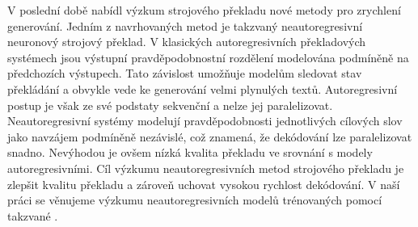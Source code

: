 V poslední době nabídl výzkum strojového překladu nové metody pro zrychlení
generování.
%
Jedním z navrhovaných metod je takzvaný neautoregresivní neuronový strojový
překlad.
%
V klasických autoregresivních překladových systémech jsou výstupní
pravděpodobnostní rozdělení modelována podmíněně na předchozích výstupech.
%
Tato závislost umožňuje modelům sledovat stav překládání a obvykle vede ke
generování velmi plynulých textů.
%
Autoregresivní postup je však ze své podstaty sekvenční a nelze jej
paralelizovat.
%
Neautoregresivní systémy modelují pravděpodobnosti jednotlivých cílových slov
jako navzájem podmíněně nezávislé, což znamená, že dekódování lze paralelizovat
snadno.
%
Nevýhodou je ovšem nízká kvalita překladu ve srovnání s modely
autoregresivními.
%
Cíl výzkumu neautoregresivních metod strojového překladu je zlepšit kvalitu
překladu a zároveň uchovat vysokou rychlost dekódování.
%
V naší práci se věnujeme výzkumu neautoregresivních modelů trénovaných pomocí
takzvané .
%





